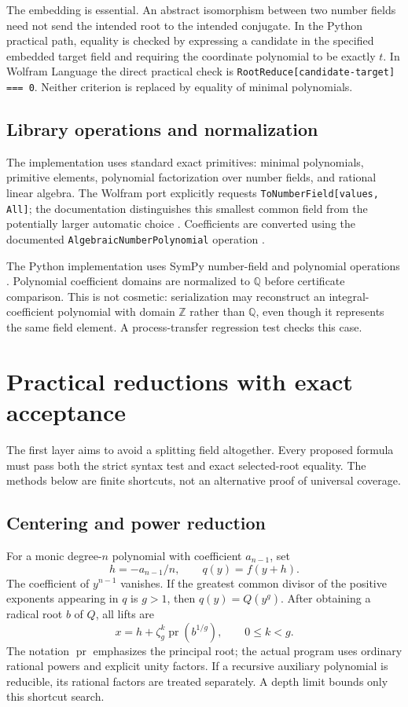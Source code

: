 \documentclass[11pt,letterpaper]{article}
\theoremstyle{definition}\newtheorem{definition}[theorem]{Definition}
\theoremstyle{remark}\newtheorem{remark}[theorem]{Remark}
\newcommand{\Q}{\mathbb Q}
\newcommand{\Z}{\mathbb Z}
\newcommand{\code}[1]{\texttt{#1}}
\newcommand{\pr}{\operatorname{pr}}
\begin{document}
The embedding is essential. An abstract isomorphism between two number
fields need not send the intended root to the intended conjugate. In the
Python practical path, equality is checked by expressing a candidate in
the specified embedded target field and requiring the coordinate polynomial
to be exactly $t$. In Wolfram Language the direct practical check is
\code{RootReduce[candidate-target] === 0}. Neither criterion is replaced
by equality of minimal polynomials.

\subsection{Library operations and normalization}
The implementation uses standard exact primitives: minimal polynomials,
primitive elements, polynomial factorization over number fields, and
rational linear algebra. The Wolfram port explicitly requests
\code{ToNumberField[values, All]}; the documentation distinguishes this
smallest common field from the potentially larger automatic choice
\cite{tonumberfield}. Coefficients are converted using the documented
\code{AlgebraicNumberPolynomial} operation \cite{anpoly}.

The Python implementation uses SymPy number-field and polynomial operations
\cite{sympy}. Polynomial coefficient domains are normalized to $\Q$ before
certificate comparison. This is not cosmetic: serialization may reconstruct
an integral-coefficient polynomial with domain $\Z$ rather than $\Q$, even
though it represents the same field element. A process-transfer regression
test checks this case.

\section{Practical reductions with exact acceptance}
\label{sec:practical}
The first layer aims to avoid a splitting field altogether. Every proposed
formula must pass both the strict syntax test and exact selected-root
equality. The methods below are finite shortcuts, not an alternative proof
of universal coverage.

\subsection{Centering and power reduction}
For a monic degree-$n$ polynomial with coefficient $a_{n-1}$, set
\[
 h=-a_{n-1}/n,\qquad q(y)=f(y+h).
\]
The coefficient of $y^{n-1}$ vanishes. If the greatest common divisor of
the positive exponents appearing in $q$ is $g>1$, then $q(y)=Q(y^g)$.
After obtaining a radical root $b$ of $Q$, all lifts are
\begin{equation}\label{eq:powerlift}
 x=h+\zeta_g^k\pr(b^{1/g}),\qquad 0\leq k<g.
\end{equation}
The notation $\pr$ emphasizes the principal root; the actual program uses
ordinary rational powers and explicit unity factors. If a recursive
auxiliary polynomial is reducible, its rational factors are treated
separately. A depth limit bounds only this shortcut search.
\end{document}
